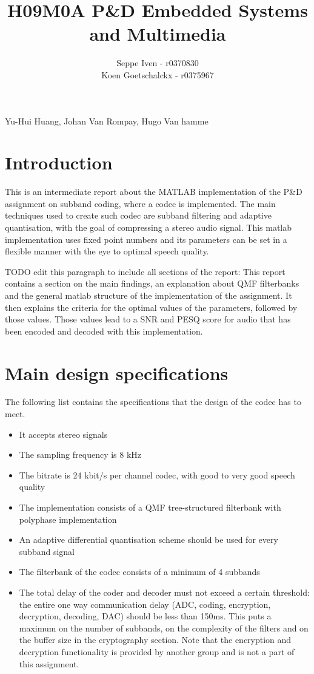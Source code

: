 \documentclass[a4paper]{article}
\title{H09M0A P\&D Embedded Systems and Multimedia}
\author{Seppe Iven - r0370830 \\ Koen Goetschalckx - r0375967}
\begin{document}
 
\maketitle
\begin{center} Yu-Hui Huang, Johan Van Rompay, Hugo Van hamme
\end{center}

\section{Introduction}
This is an intermediate report about the MATLAB implementation of the P\&D assignment on subband coding, where a codec is implemented. The main techniques used to create such codec are subband filtering and adaptive quantisation, with the goal of compressing a stereo audio signal. This matlab implementation uses fixed point numbers and its parameters can be set in a flexible manner with the eye to optimal speech quality. \

TODO edit this paragraph to include all sections of the report:
This report contains a section on the main findings, an explanation about QMF filterbanks and the general matlab structure of the implementation of the assignment. It then explains the criteria for the optimal values of the parameters, followed by those values. Those values lead to a SNR and PESQ score for audio that has been encoded and decoded with this implementation.

\section{Main design specifications}
The following list contains the specifications that the design of the codec has to meet.

\begin{itemize}
\item It accepts stereo signals
\item The sampling frequency is 8 kHz
\item The bitrate is 24 kbit/s per channel codec, with good to very good speech quality
\item The implementation consists of a QMF tree-structured filterbank with polyphase implementation
\item An adaptive differential quantisation scheme should be used for every subband signal
\item The filterbank of the codec consists of a minimum of 4 subbands
\item The total delay of the coder and decoder must not exceed a certain threshold: the entire one way communication delay (ADC, coding, encryption, decryption, decoding, DAC) should be less than 150ms. This puts a maximum on the number of subbands, on the complexity of the filters and on the buffer size in the cryptography section. Note that the encryption and decryption functionality is provided by another group and is not a part of this assignment.

\end{itemize}
\end{document}
